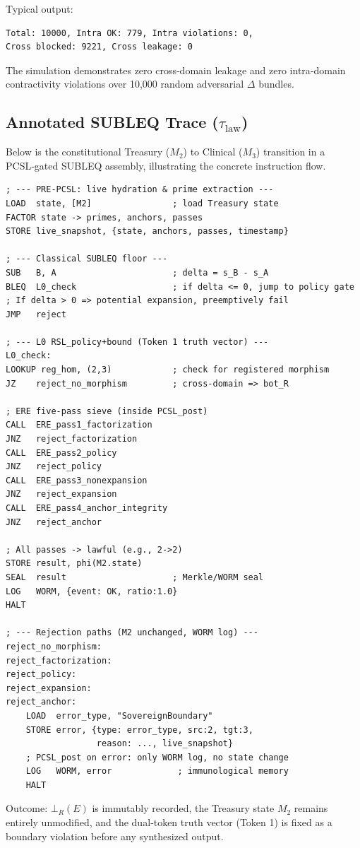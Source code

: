 \documentclass[11pt,a4paper]{article}
\theoremstyle{definition}
\theoremstyle{remark}
\begin{document}
Typical output:
\begin{verbatim}
Total: 10000, Intra OK: 779, Intra violations: 0,
Cross blocked: 9221, Cross leakage: 0
\end{verbatim}
The simulation demonstrates zero cross‑domain leakage and zero intra‑domain contractivity violations over 10,000 random adversarial $\Delta$ bundles.

\subsection{Annotated SUBLEQ Trace ($\tau_\text{law}$)}
\label{subsec:trace}
Below is the constitutional Treasury ($M_2$) to Clinical ($M_3$) transition in a PCSL‑gated SUBLEQ assembly, illustrating the concrete instruction flow.

\begin{lstlisting}[style=asmstyle, caption={Annotated $\tau_\text{law}$ trace for Treasury $M_2$ $\to$ Clinical $M_3$ (sovereign boundary rejection)}, label=lst:asm]
; --- PRE-PCSL: live hydration & prime extraction ---
LOAD  state, [M2]                ; load Treasury state
FACTOR state -> primes, anchors, passes
STORE live_snapshot, {state, anchors, passes, timestamp}

; --- Classical SUBLEQ floor ---
SUB   B, A                       ; delta = s_B - s_A
BLEQ  L0_check                   ; if delta <= 0, jump to policy gate
; If delta > 0 => potential expansion, preemptively fail
JMP   reject

; --- L0 RSL_policy+bound (Token 1 truth vector) ---
L0_check:
LOOKUP reg_hom, (2,3)            ; check for registered morphism
JZ    reject_no_morphism         ; cross-domain => bot_R

; ERE five-pass sieve (inside PCSL_post)
CALL  ERE_pass1_factorization
JNZ   reject_factorization
CALL  ERE_pass2_policy
JNZ   reject_policy
CALL  ERE_pass3_nonexpansion
JNZ   reject_expansion
CALL  ERE_pass4_anchor_integrity
JNZ   reject_anchor

; All passes -> lawful (e.g., 2->2)
STORE result, phi(M2.state)
SEAL  result                     ; Merkle/WORM seal
LOG   WORM, {event: OK, ratio:1.0}
HALT

; --- Rejection paths (M2 unchanged, WORM log) ---
reject_no_morphism:
reject_factorization:
reject_policy:
reject_expansion:
reject_anchor:
    LOAD  error_type, "SovereignBoundary"
    STORE error, {type: error_type, src:2, tgt:3,
                  reason: ..., live_snapshot}
    ; PCSL_post on error: only WORM log, no state change
    LOG   WORM, error             ; immunological memory
    HALT
\end{lstlisting}
Outcome: $\bot_R(E)$ is immutably recorded, the Treasury state $M_2$ remains entirely unmodified, and the dual‑token truth vector (Token 1) is fixed as a boundary violation before any synthesized output.
\end{document}
